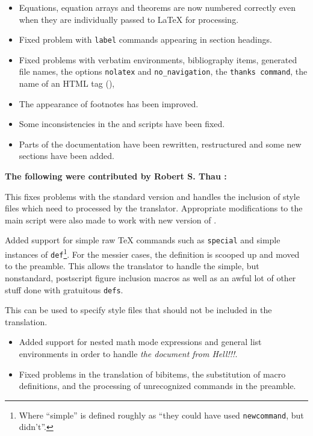 \begin{htmllist}
\item [\textbf{Minor Changes and Bug Fixes}] \hfill
\begin{itemize}
\item Equations, equation arrays and theorems are now numbered
correctly even when they are individually passed to LaTeX for
processing.
\item Fixed problem with \texttt{label} commands appearing in section
headings.
\item Fixed problems with verbatim environments, bibliography items,
  generated file names, the options \texttt{nolatex} and
  \texttt{no\_navigation}, the \texttt{thanks command}, the name of an
  HTML tag (),
\item The appearance of footnotes has been improved.
\item Some inconsistencies in the  and 
 scripts have been fixed.  
\item Parts of the documentation have been rewritten, restructured and
some new sections have been added. 
\end{itemize}
\end{htmllist}

\textbf{The following were contributed by Robert S. Thau
:}

\begin{htmllist}
\item [\textbf{New Texexpand}]
This fixes problems with the standard version and 
handles the inclusion of style files which need to processed by the 
translator. Appropriate modifications to the main script were also 
made to work with new version of . 

\item [\textbf{Handling of Raw \TeX}]
Added support for simple raw TeX commands such as  
\texttt{special} and simple instances of \texttt{def}\footnote{Where
``simple'' is defined roughly 
as ``they could have used \texttt{newcommand}, but didn't''.}. 
For the messier cases, 
the definition is scooped up and moved to the preamble.  This allows 
the translator to handle the simple, but nonstandard, postscript figure inclusion
macros as well as an awful lot of other stuff done with gratuitous 
\texttt{defs}.
\item [\textbf{More Options}] \hfill
\begin{htmllist}
\item [\texttt{dont\_include}]
This can be used  to specify style files that
should not be included in the translation.
\end{htmllist}
\item [\textbf{Other Changes}] \hfill
\begin{itemize} 
\item Added support for nested math mode expressions and general
list environments in order to handle \emph{the document from Hell!!!}.
\item Fixed problems in the translation of 
bibitems, the substitution of macro definitions, and the processing of
unrecognized commands in the preamble.
\end{itemize}
\end{htmllist}

